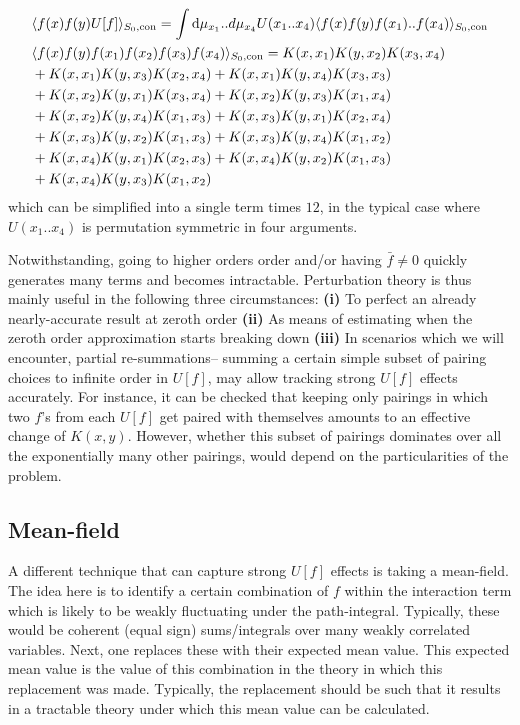 \begin{align}
&\langle f(x) f(y) U[f] \rangle_{S_0,\text{con}} = \int \text{d}\mu_{x_1}..d \mu_{x_4} U(x_1..x_4) \langle f(x) f(y) f(x_1)..f(x_4) \rangle_{S_0,\text{con}} \\ \nonumber 
&\langle f(x) f(y) f(x_1)f(x_2)f(x_3)f(x_4) \rangle_{S_0,\text{con}} = K(x,x_1)K(y,x_2) K(x_3,x_4)\\ \nonumber 
&+ K(x,x_1)K(y,x_3) K(x_2,x_4) + K(x,x_1)K(y,x_4) K(x_3,x_3) \\ \nonumber &+ K(x,x_2)K(y,x_1) K(x_3,x_4) + K(x,x_2)K(y,x_3) K(x_1,x_4) \\ \nonumber 
&+ K(x,x_2)K(y,x_4) K(x_1,x_3) +  K(x,x_3)K(y,x_1) K(x_2,x_4)\\ \nonumber 
&+ K(x,x_3)K(y,x_2) K(x_1,x_3) +  K(x,x_3)K(y,x_4) K(x_1,x_2) \\ \nonumber 
&+ K(x,x_4)K(y,x_1)K(x_2,x_3) +  K(x,x_4)K(y,x_2) K(x_1,x_3)\\ \nonumber 
&+  K(x,x_4)K(y,x_3) K(x_1,x_2)
\end{align}
which can be simplified into a single term times $12$, in the typical case where $U(x_1..x_4)$ is permutation symmetric in four arguments. 

Notwithstanding, going to higher orders order and/or having $\bar{f}\neq 0$ quickly generates many terms and becomes intractable. Perturbation theory is thus mainly useful in the following three circumstances: {\bf (i)} To perfect an already nearly-accurate result at zeroth order {\bf (ii)} As means of estimating when the zeroth order approximation starts breaking down {\bf (iii)} In scenarios which we will encounter, partial re-summations-- summing a certain simple subset of pairing choices to infinite order in $U[f]$, may allow tracking strong $U[f]$ effects accurately. For instance, it can be checked that keeping only pairings in which two $f$'s from each $U[f]$ get paired with themselves amounts to an effective change of $K(x,y)$. However, whether this subset of pairings dominates over all the exponentially many other pairings, would depend on the particularities of the problem. 

\subsection{Mean-field}
\label{ssec:mean_field}
A different technique that can capture strong $U[f]$ effects is taking a mean-field. The idea here is to identify a certain combination of $f$ within the interaction term which is likely to be weakly fluctuating under the path-integral. Typically, these would be coherent (equal sign) sums/integrals over many weakly correlated variables. Next, one replaces these with their expected mean value. This expected mean value is the value of this combination in the theory in which this replacement was made. Typically, the replacement should be such that it results in a tractable theory under which this mean value can be calculated. 

